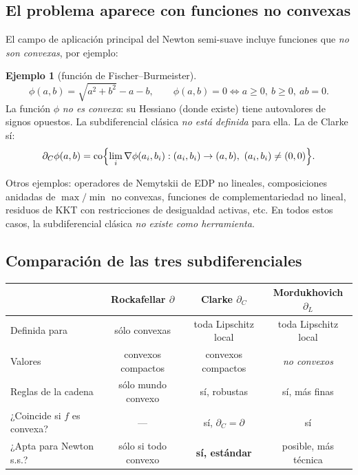 \documentclass[12pt]{book}
\newcommand{\co}{\operatorname{co}}
\newcommand{\subdiffC}{\partial_C}
\newcommand{\subdiffL}{\partial_L}
\newcommand{\subdiffR}{\partial}
\theoremstyle{definition}
\newtheorem{ejemplo}{Ejemplo}[section]
\theoremstyle{plain}
\theoremstyle{remark}
\begin{document}
\subsection{El problema aparece con funciones no convexas}

El campo de aplicación principal del Newton semi-suave incluye
funciones que \emph{no son convexas}, por ejemplo:

\begin{ejemplo}[función de Fischer--Burmeister]
  \[
    \phi(a,b)=\sqrt{a^{2}+b^{2}}-a-b,
    \qquad \phi(a,b)=0\iff a\ge0,\ b\ge0,\ ab=0.
  \]
  La función $\phi$ \emph{no es convexa}: su Hessiano (donde existe)
  tiene autovalores de signos opuestos.  La subdiferencial clásica
  \emph{no está definida} para ella.  La de Clarke sí:
  \[
    \subdiffC\phi(a,b)=\co\Bigl\{\lim_{i}\nabla\phi(a_i,b_i):
    (a_i,b_i)\to(a,b),\ (a_i,b_i)\ne(0,0)\Bigr\}.
  \]
\end{ejemplo}

Otros ejemplos: operadores de Nemytskii de EDP no lineales,
composiciones anidadas de $\max/\min$ no convexas, funciones de
complementariedad no lineal, residuos de KKT con restricciones de
desigualdad activas, etc.  En todos estos casos, la subdiferencial
clásica \emph{no existe como herramienta}.

\subsection{Comparación de las tres subdiferenciales}

\begin{center}
\renewcommand{\arraystretch}{1.35}
\begin{tabular}{@{}l c c c@{}}
\toprule
   & \textbf{Rockafellar} $\subdiffR$
   & \textbf{Clarke} $\subdiffC$
   & \textbf{Mordukhovich} $\subdiffL$ \\
\midrule
Definida para        & sólo convexas       & toda Lipschitz local & toda Lipschitz local \\
Valores              & convexos compactos  & convexos compactos   & \emph{no convexos} \\
Reglas de la cadena  & sólo mundo convexo  & sí, robustas          & sí, más finas \\
¿Coincide si $f$ es convexa?
                     & ---                 & sí, $\subdiffC=\subdiffR$ & sí \\
¿Apta para Newton s.s.?
                     & sólo si todo convexo & \textbf{sí, estándar} & posible, más técnica \\
\bottomrule
\end{tabular}
\end{center}
\end{document}
